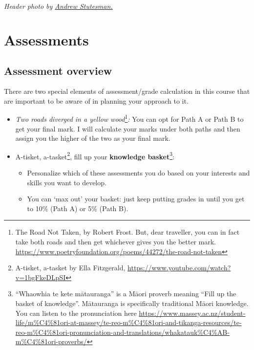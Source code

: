 \documentclass[
]{book}
\begin{document}
\emph{Header photo by \href{https://unsplash.com/@drewmark}{Andrew Stutesman.}}

\hypertarget{part-assessments}{%
\part*{Assessments}\label{part-assessments}}

\hypertarget{assessments}{%
\chapter{Assessment overview}\label{assessments}}

There are two special elements of assessment/grade calculation in this course that are important to be aware of in planning your approach to it.

\begin{itemize}
\item
  \emph{Two roads diverged in a yellow wood}\footnote{The Road Not Taken, by Robert Frost. But, dear traveller, you can in fact take both roads and then get whichever gives you the better mark. \url{https://www.poetryfoundation.org/poems/44272/the-road-not-taken}}\emph{:} You can opt for Path A or Path B to get your final mark. I will calculate your marks under both paths and then assign you the higher of the two as your final mark.
\item
  A-tisket, a-tasket\footnote{A-tisket, a-tasket by Ella Fitzgerald, \url{https://www.youtube.com/watch?v=1bgFkeDLpSI}}, fill up your \textbf{knowledge basket}\footnote{``Whaowhia te kete mātauranga'' is a Māori proverb meaning ``Fill up the basket of knowledge''. Mātauranga is specifically traditional Māori knowledge. You can listen to the pronunciation here \url{https://www.massey.ac.nz/student-life/m\%C4\%81ori-at-massey/te-reo-m\%C4\%81ori-and-tikanga-resources/te-reo-m\%C4\%81ori-pronunciation-and-translations/whakatauk\%C4\%AB-m\%C4\%81ori-proverbs/}}:

  \begin{itemize}
  \item
    Personalize which of these assessments you do based on your interests and skills you want to develop.
  \item
    You can `max out' your basket: just keep putting grades in until you get to 10\% (Path A) or 5\% (Path B).
  \end{itemize}
\end{itemize}
\end{document}
